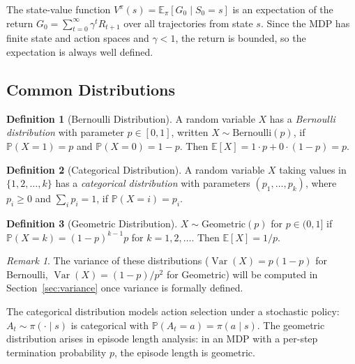 \documentclass[11pt,a4paper]{article}
\theoremstyle{definition}
\newtheorem{definition}{Definition}[section]
\theoremstyle{plain}
\theoremstyle{remark}
\newtheorem{remark}{Remark}[section]
\DeclareMathOperator{\Var}{Var}
\newcommand{\E}{\mathbb{E}}
\newcommand{\Prob}{\mathbb{P}}
\begin{document}
\begin{tdconnection}
The state-value function $V^\pi(s) = \E_\pi[G_0 \mid S_0 = s]$ is an expectation of the return $G_0 = \sum_{t=0}^\infty \gamma^t R_{t+1}$ over all trajectories from state $s$. Since the MDP has finite state and action spaces and $\gamma < 1$, the return is bounded, so the expectation is always well defined.
\end{tdconnection}

\subsection{Common Distributions}
\label{subsec:common_dist}

\begin{definition}[Bernoulli Distribution]
\label{def:bernoulli}
A random variable $X$ has a \emph{Bernoulli distribution} with parameter $p \in [0,1]$, written $X \sim \text{Bernoulli}(p)$, if $\Prob(X = 1) = p$ and $\Prob(X = 0) = 1 - p$. Then $\E[X] = 1 \cdot p + 0 \cdot (1-p) = p$.
\end{definition}

\begin{definition}[Categorical Distribution]
\label{def:categorical}
A random variable $X$ taking values in $\{1, 2, \ldots, k\}$ has a \emph{categorical distribution} with parameters $(p_1, \ldots, p_k)$, where $p_i \geq 0$ and $\sum_i p_i = 1$, if $\Prob(X = i) = p_i$.
\end{definition}

\begin{definition}[Geometric Distribution]
\label{def:geometric}
$X \sim \text{Geometric}(p)$ for $p \in (0,1]$ if $\Prob(X = k) = (1-p)^{k-1} p$ for $k = 1, 2, \ldots$. Then $\E[X] = 1/p$.
\end{definition}

\begin{remark}
The variance of these distributions ($\Var(X) = p(1-p)$ for Bernoulli, $\Var(X) = (1-p)/p^2$ for Geometric) will be computed in Section~\ref{sec:variance} once variance is formally defined.
\end{remark}

\begin{rlconnection}[Connection to RL]
The categorical distribution models action selection under a stochastic policy: $A_t \sim \pi(\cdot \mid s)$ is categorical with $\Prob(A_t = a) = \pi(a \mid s)$. The geometric distribution arises in episode length analysis: in an MDP with a per-step termination probability $p$, the episode length is geometric.
\end{rlconnection}
\end{document}

